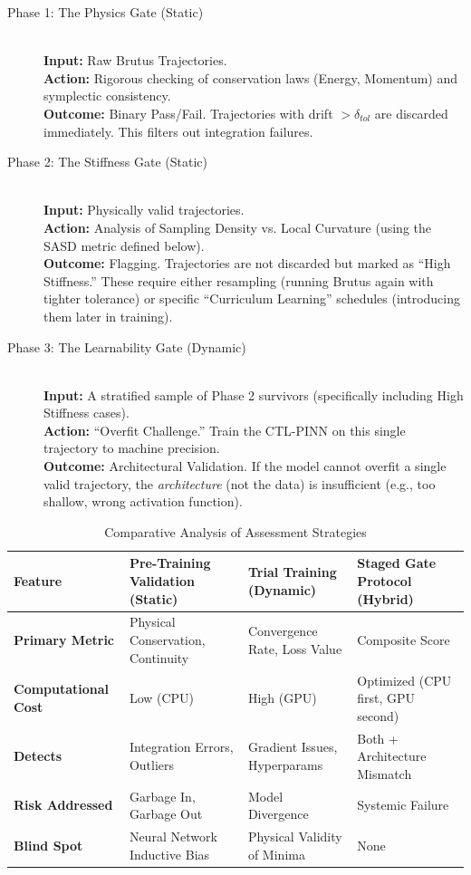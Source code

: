 \begin{description}
    \item[Phase 1: The Physics Gate (Static)] \hfill \\
    \textbf{Input:} Raw Brutus Trajectories. \\
    \textbf{Action:} Rigorous checking of conservation laws (Energy, Momentum) and symplectic consistency. \\
    \textbf{Outcome:} Binary Pass/Fail. Trajectories with drift $> \delta_{tol}$ are discarded immediately. This filters out integration failures.

    \item[Phase 2: The Stiffness Gate (Static)] \hfill \\
    \textbf{Input:} Physically valid trajectories. \\
    \textbf{Action:} Analysis of Sampling Density vs. Local Curvature (using the SASD metric defined below). \\
    \textbf{Outcome:} Flagging. Trajectories are not discarded but marked as ``High Stiffness.'' These require either resampling (running Brutus again with tighter tolerance) or specific ``Curriculum Learning'' schedules (introducing them later in training).

    \item[Phase 3: The Learnability Gate (Dynamic)] \hfill \\
    \textbf{Input:} A stratified sample of Phase 2 survivors (specifically including High Stiffness cases). \\
    \textbf{Action:} ``Overfit Challenge.'' Train the CTL-PINN on this single trajectory to machine precision. \\
    \textbf{Outcome:} Architectural Validation. If the model cannot overfit a single valid trajectory, the \textit{architecture} (not the data) is insufficient (e.g., too shallow, wrong activation function).
\end{description}

\begin{table}[htbp]
\centering
\caption{Comparative Analysis of Assessment Strategies}
\label{tab:assessment_strategies}
\begin{tabular}{@{}p{}p{}p{}p{}@{}}
\toprule
\textbf{Feature} & \textbf{Pre-Training Validation (Static)} & \textbf{Trial Training (Dynamic)} & \textbf{Staged Gate Protocol (Hybrid)} \\ \midrule
\textbf{Primary Metric} & Physical Conservation, Continuity & Convergence Rate, Loss Value & Composite Score \\
\textbf{Computational Cost} & Low (CPU) & High (GPU) & Optimized (CPU first, GPU second) \\
\textbf{Detects} & Integration Errors, Outliers & Gradient Issues, Hyperparams & Both + Architecture Mismatch \\
\textbf{Risk Addressed} & Garbage In, Garbage Out & Model Divergence & Systemic Failure \\
\textbf{Blind Spot} & Neural Network Inductive Bias & Physical Validity of Minima & None \\ \bottomrule
\end{tabular}
\end{table}